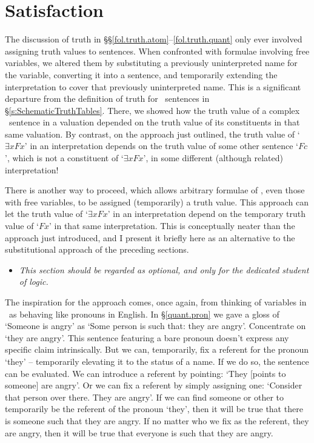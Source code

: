 \section{Satisfaction} %

The discussion of truth in §§\ref{fol.truth.atom}–\ref{fol.truth.quant} only ever involved assigning truth values to sentences. When confronted with formulae involving free variables, we altered them by substituting a previously uninterpreted name for the variable, converting it into a sentence, and temporarily extending the interpretation to cover that previously uninterpreted name. This is a significant departure from the definition of truth for \TFL\ sentences in §\ref{s:SchematicTruthTables}. There, we showed how the truth value of a complex \TFL\ sentence in a valuation depended on the truth value of its constituents in that same valuation. By contrast, on the approach just outlined, the truth value of `$\exists x Fx$' in an interpretation depends on the truth value of some other sentence `$Fc$', which is not a constituent of `$\exists x Fx$', in some different (although related) interpretation! 

There is another way to proceed, which allows arbitrary formulae of \FOL, even those with free variables, to be assigned (temporarily) a truth value. This approach can let the truth value of `$\exists x Fx$' in an interpretation depend on the temporary truth value of `$Fx$' in that same interpretation. This is conceptually  neater than the approach just introduced, and I present it briefly here as an alternative to the substitutional approach of the preceding sections.

\begin{itemize}
 	\item \emph{This section should be regarded as optional, and only for the dedicated student of logic.}
 \end{itemize} 

The inspiration for the approach comes, once again, from thinking of variables in \FOL\ as behaving like pronouns in English. In §\ref{quant.pron} we gave a gloss of `Someone is angry' as `Some person is such that: they are angry'. Concentrate on `they are angry'. This sentence featuring a bare pronoun doesn't express any specific claim intrinsically. But we can, temporarily, fix a referent for the pronoun `they' – temporarily elevating it to the status of a name. If we do so, the sentence can be evaluated. We can introduce a referent by pointing: `They [points to someone] are angry'. Or we can fix a referent by simply assigning one: `Consider that person over there. They are angry'. If we can find someone or other to temporarily be the referent of the pronoun `they', then it will be true that there is someone such that they are angry. If no matter who we fix as the referent, they are angry, then it will be true that everyone is such that they are angry. 

